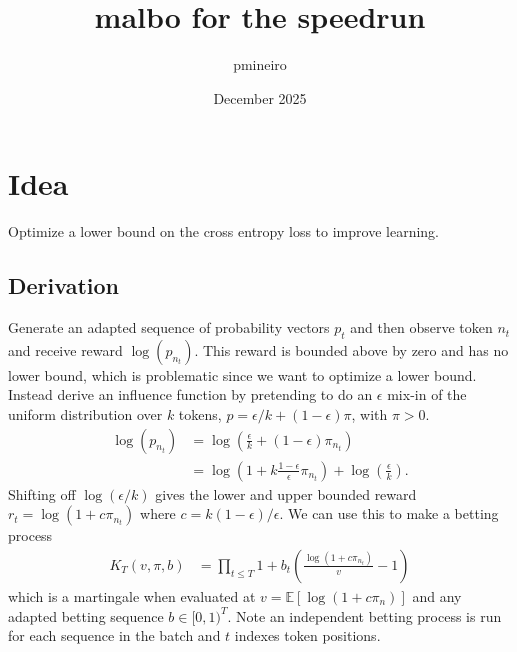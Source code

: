 \documentclass{article}
\title{malbo for the speedrun}
\author{pmineiro}
\date{December 2025}
\begin{document}
\maketitle

\section{Idea}

Optimize a lower bound on the cross entropy loss to improve learning.  

\subsection{Derivation} 
Generate an adapted sequence of probability vectors $p_t$ and then observe token $n_t$ and receive
reward $\log(p_{n_t})$. This reward is bounded above by zero and has no lower bound,
which is problematic since we want to optimize a lower bound.  Instead derive an
influence function by pretending to do an $\epsilon$ mix-in of the uniform distribution
over  $k$ tokens, $p = \epsilon / k + (1 - \epsilon) \pi$, with $\pi > 0$.
\begin{align*}
\log\left(p_{n_t}\right) &= \log\left( \frac{\epsilon}{k} + \left(1 - \epsilon \right) \pi_{n_t} \right) \\
&= \log\left(1 + k \frac{1 - \epsilon}{\epsilon} \pi_{n_t}\right) + \log\left(\frac{\epsilon}{k}\right).
\end{align*}
Shifting off $\log(\epsilon/k)$ gives the lower and upper bounded reward $r_t = \log(1
+ c \pi_{n_t})$ where $c = k (1 - \epsilon) / \epsilon$.  We can use this to make a
betting process
\begin{align}
K_T(v, \pi, b) &= \prod_{t \leq T} 1 + b_t \left(\frac{\log(1 + c \pi_{n_t})}{v} - 1\right) \label{eqn:bettingcs}
\end{align}
which is a martingale when evaluated at $v = \mathbb{E}\left[\log(1 + c \pi_n)\right]$ and any
adapted betting sequence $b \in [0, 1)^T$.  Note an independent betting process is run for each 
sequence in the batch and $t$ indexes token positions.
\end{document}
